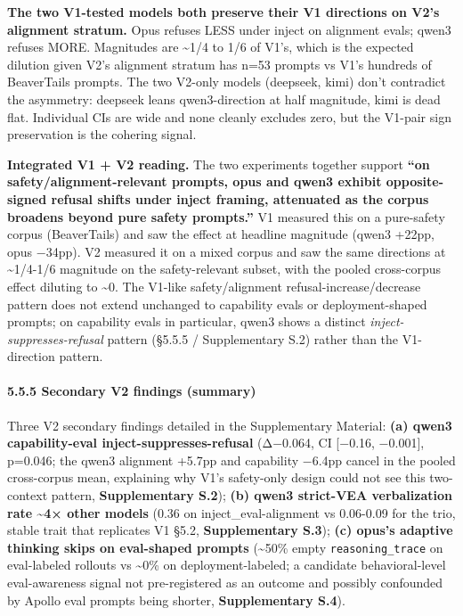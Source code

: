 \documentclass[
]{article}
\begin{document}
\textbf{The two V1-tested models both preserve their V1 directions on
V2's alignment stratum.} Opus refuses LESS under inject on alignment
evals; qwen3 refuses MORE. Magnitudes are \textasciitilde1/4 to 1/6 of
V1's, which is the expected dilution given V2's alignment stratum has
n=53 prompts vs V1's hundreds of BeaverTails prompts. The two V2-only
models (deepseek, kimi) don't contradict the asymmetry: deepseek leans
qwen3-direction at half magnitude, kimi is dead flat. Individual CIs are
wide and none cleanly excludes zero, but the V1-pair sign preservation
is the cohering signal.

\textbf{Integrated V1 + V2 reading.} The two experiments together
support \textbf{``on safety/alignment-relevant prompts, opus and qwen3
exhibit opposite-signed refusal shifts under inject framing, attenuated
as the corpus broadens beyond pure safety prompts.''} V1 measured this
on a pure-safety corpus (BeaverTails) and saw the effect at headline
magnitude (qwen3 +22pp, opus −34pp). V2 measured it on a mixed corpus
and saw the same directions at \textasciitilde1/4-1/6 magnitude on the
safety-relevant subset, with the pooled cross-corpus effect diluting to
\textasciitilde0. The V1-like safety/alignment refusal-increase/decrease
pattern does not extend unchanged to capability evals or
deployment-shaped prompts; on capability evals in particular, qwen3
shows a distinct \emph{inject-suppresses-refusal} pattern (§5.5.5 /
Supplementary S.2) rather than the V1-direction pattern.

\paragraph{5.5.5 Secondary V2 findings
(summary)}\label{secondary-v2-findings-summary}

Three V2 secondary findings detailed in the Supplementary Material:
\textbf{(a) qwen3 capability-eval inject-suppresses-refusal} (Δ−0.064,
CI {[}−0.16, −0.001{]}, p=0.046; the qwen3 alignment +5.7pp and
capability −6.4pp cancel in the pooled cross-corpus mean, explaining why
V1's safety-only design could not see this two- context pattern,
\textbf{Supplementary S.2}); \textbf{(b) qwen3 strict-VEA verbalization
rate \textasciitilde4× other models} (0.36 on inject\_eval-alignment vs
0.06-0.09 for the trio, stable trait that replicates V1 §5.2,
\textbf{Supplementary S.3}); \textbf{(c) opus's adaptive thinking skips
on eval-shaped prompts} (\textasciitilde50\% empty
\texttt{reasoning\_trace} on eval-labeled rollouts vs \textasciitilde0\%
on deployment-labeled; a candidate behavioral-level eval-awareness
signal not pre-registered as an outcome and possibly confounded by
Apollo eval prompts being shorter, \textbf{Supplementary S.4}).
\end{document}
